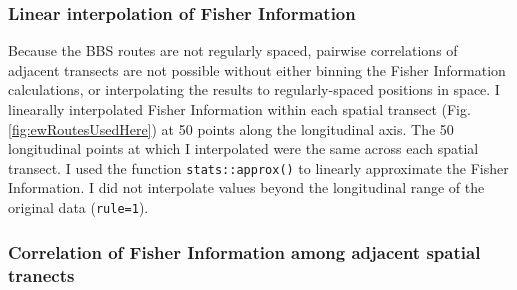 \documentclass[12pt,twoside,openany]{reedthesis}
\begin{document}
\subsubsection{Linear interpolation of Fisher
Information}\label{linear-interpolation-of-fisher-information}

Because the BBS routes are not regularly spaced, pairwise correlations
of adjacent transects are not possible without either binning the Fisher
Information calculations, or interpolating the results to
regularly-spaced positions in space. I linearally interpolated Fisher
Information within each spatial transect (Fig.
\ref{fig:ewRoutesUsedHere}) at 50 points along the longitudinal axis.
The 50 longitudinal points at which I interpolated were the same across
each spatial transect. I used the function \texttt{stats::approx()} to
linearly approximate the Fisher Information. I did not interpolate
values beyond the longitudinal range of the original data
(\texttt{rule=1}).

\subsubsection{Correlation of Fisher Information among adjacent spatial
tranects}\label{correlation-of-fisher-information-among-adjacent-spatial-tranects}
\end{document}
